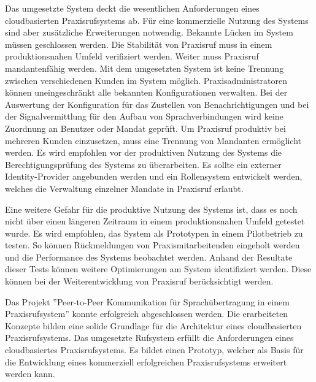 Das umgesetzte System deckt die wesentlichen Anforderungen eines cloudbasierten Praxisrufsystems ab.
Für eine kommerzielle Nutzung des Systems sind aber zusätzliche Erweiterungen notwendig.
Bekannte Lücken im System müssen geschlossen werden.
Die Stabilität von Praxisruf muss in einem produktionsnahen Umfeld verifiziert werden.
Weiter muss Praxisruf mandantenfähig werden.
Mit dem umgesetzten System ist keine Trennung zwischen verschiedenen Kunden im System möglich.
Praxisadministratoren können uneingeschränkt alle bekannten Konfigurationen verwalten.
Bei der Auswertung der Konfiguration für das Zustellen von Benachrichtigungen und bei der Signalvermittlung für den Aufbau von Sprachverbindungen wird keine Zuordnung an Benutzer oder Mandat geprüft.
Um Praxisruf produktiv bei mehreren Kunden einzusetzen, muss eine Trennung von Mandanten ermöglicht werden.
Es wird empfohlen vor der produktiven Nutzung des Systems die Berechtigungsprüfung des Systems zu überarbeiten.
Es sollte ein externer Identity-Provider angebunden werden und ein Rollensystem entwickelt werden, welches die Verwaltung einzelner Mandate in Praxisruf erlaubt.

Eine weitere Gefahr für die produktive Nutzung des Systems ist, dass es noch nicht über einen längeren Zeitraum in einem produktionsnahen Umfeld getestet wurde.
Es wird empfohlen, das System als Prototypen in einem Pilotbetrieb zu testen.
So können Rückmeldungen von Praxismitarbeitenden eingeholt werden und die Performance des Systems beobachtet werden.
Anhand der Resultate dieser Tests können weitere Optimierungen am System identifiziert werden.
Diese können bei der Weiterentwicklung von Praxisruf berücksichtigt werden.

Das Projekt ''Peer-to-Peer Kommunikation für Sprachübertragung in einem Praxisrufsystem'' konnte erfolgreich abgeschlossen werden.
Die erarbeiteten Konzepte bilden eine solide Grundlage für die Architektur eines cloudbasierten Praxisrufsystems.
Das umgesetzte Rufsystem erfüllt die Anforderungen eines cloudbasiertes Praxisrufsystems.
Es bildet einen Prototyp, welcher als Basis für die Entwicklung eines kommerziell erfolgreichen Praxisrufsystems erweitert werden kann.

\clearpage
